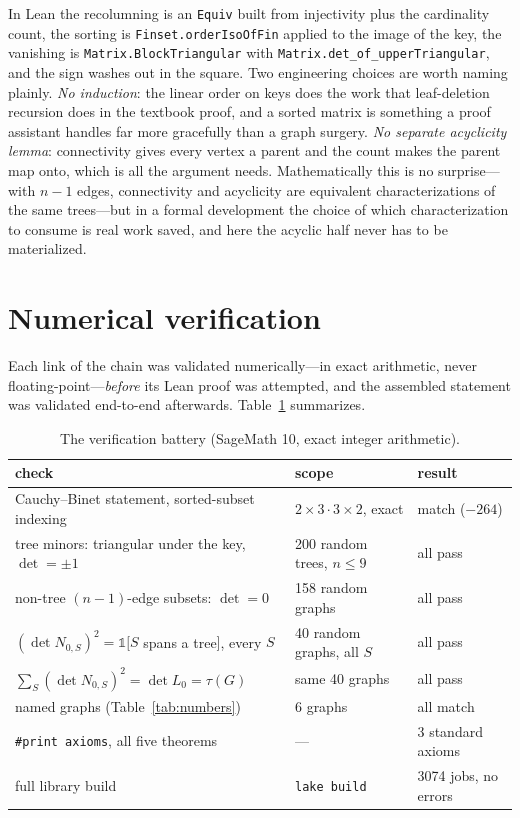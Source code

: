 \documentclass[11pt]{article}
\newcommand{\lean}[1]{\texttt{#1}}
\begin{document}
In Lean the recolumning is an \lean{Equiv} built from injectivity plus the cardinality count,
the sorting is \lean{Finset.orderIsoOfFin} applied to the image of the key, the vanishing is
\lean{Matrix.BlockTriangular} with \lean{Matrix.det\_of\_upperTriangular}, and the sign washes
out in the square. Two engineering choices are worth naming plainly. \emph{No induction}: the
linear order on keys does the work that leaf-deletion recursion does in the textbook proof, and
a sorted matrix is something a proof assistant handles far more gracefully than a graph
surgery. \emph{No separate acyclicity lemma}: connectivity gives every vertex a parent and the
count makes the parent map onto, which is all the argument needs. Mathematically this is no
surprise---with $n-1$ edges, connectivity and acyclicity are equivalent characterizations of
the same trees---but in a formal development the choice of which characterization to consume is
real work saved, and here the acyclic half never has to be materialized.

\section{Numerical verification}
\label{sec:verification}

Each link of the chain was validated numerically---in exact arithmetic, never
floating-point---\emph{before} its Lean proof was attempted, and the assembled statement was
validated end-to-end afterwards. Table~\ref{tab:verification} summarizes.

\begin{table}[h]
\centering\small
{}
\begin{tabular}{lll}
\toprule
\rowcolor{ggteal!18} check & scope & result \\
\midrule
Cauchy--Binet statement, sorted-subset indexing & $2\times3\cdot3\times2$, exact & match ($-264$) \\
tree minors: triangular under the key, $\det=\pm1$ & 200 random trees, $n\le9$ & all pass \\
non-tree $(n{-}1)$-edge subsets: $\det=0$ & 158 random graphs & all pass \\
$(\det N_{0,S})^2=\mathbb 1[S$ spans a tree$]$, every $S$ & 40 random graphs, all $S$ & all pass \\
$\sum_S(\det N_{0,S})^2=\det L_0=\tau(G)$ & same 40 graphs & all pass \\
named graphs (Table~\ref{tab:numbers}) & 6 graphs & all match \\
\lean{\#print axioms}, all five theorems & --- & 3 standard axioms \\
full library build & \lean{lake build} & 3074 jobs, no errors \\
\bottomrule
\end{tabular}
\caption{The verification battery (SageMath 10, exact integer arithmetic).}
\label{tab:verification}
\end{table}
\end{document}
